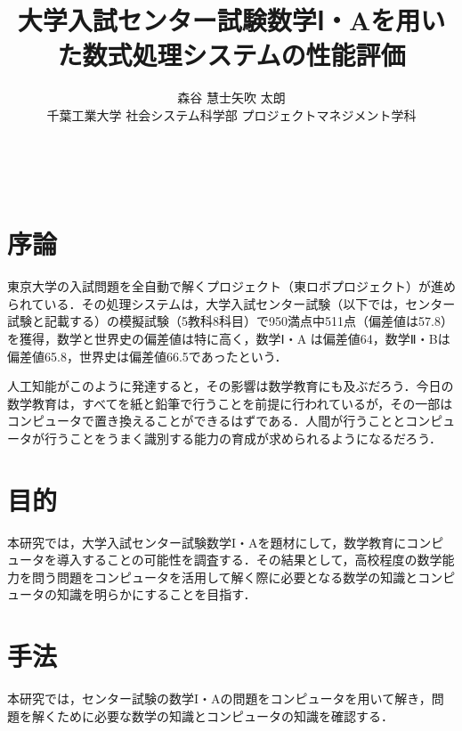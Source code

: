\documentclass[uplatex,twocolumn]{jsarticle}
\title{\vspace{-10mm}\Large{大学入試センター試験数学Ⅰ・Aを用いた数式処理システムの性能評価}\footnotemark[0]}
\author{\large{森谷 慧士\footnotemark[2]\qquad 矢吹 太朗}\\千葉工業大学 社会システム科学部 プロジェクトマネジメント学科\footnotemark[3]}
\date{}
\begin{document}
\twocolumn[\maketitle]
​

\begingroup
\def\thefootnote{\fnsymbol{footnote}}
\endgroup



\section{序論}

東京大学の入試問題を全自動で解くプロジェクト（東ロボプロジェクト）が進められている\cite{arai2014}．その処理システムは，大学入試センター試験（以下では，センター試験と記載する）の模擬試験（5教科8科目）で950満点中511点（偏差値は57.8）を獲得，数学と世界史の偏差値は特に高く，数学Ⅰ・A は偏差値64，数学Ⅱ・Bは偏差値65.8，世界史は偏差値66.5であったという\cite{tourobo}．

人工知能がこのように発達すると，その影響は数学教育にも及ぶだろう．今日の数学教育は，すべてを紙と鉛筆で行うことを前提に行われているが，その一部はコンピュータで置き換えることができるはずである．人間が行うこととコンピュータが行うことをうまく識別する能力の育成が求められるようになるだろう．

\section{目的}

本研究では，大学入試センター試験数学I・Aを題材にして，数学教育にコンピュータを導入することの可能性を調査する．その結果として，高校程度の数学能力を問う問題をコンピュータを活用して解く際に必要となる数学の知識とコンピュータの知識を明らかにすることを目指す．





\section{手法}

本研究では，センター試験の数学I・Aの問題をコンピュータを用いて解き，問題を解くために必要な数学の知識とコンピュータの知識を確認する．
\end{document}
